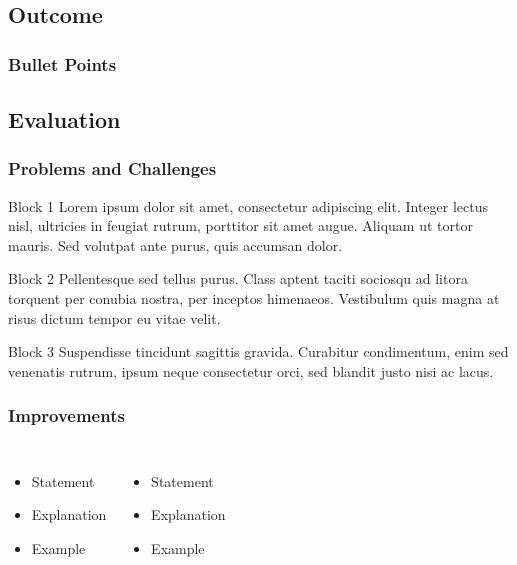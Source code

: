 \documentclass{beamer}
\begin{document}
\subsection{Outcome}
\begin{frame}
\frametitle{Bullet Points}




\end{frame}

\subsection{Evaluation}


\begin{frame}
\frametitle{Problems and Challenges}


\begin{block}{Block 1}
Lorem ipsum dolor sit amet, consectetur adipiscing elit. Integer lectus nisl, ultricies in feugiat rutrum, porttitor sit amet augue. Aliquam ut tortor mauris. Sed volutpat ante purus, quis accumsan dolor.
\end{block}

\begin{block}{Block 2}
Pellentesque sed tellus purus. Class aptent taciti sociosqu ad litora torquent per conubia nostra, per inceptos himenaeos. Vestibulum quis magna at risus dictum tempor eu vitae velit.
\end{block}

\begin{block}{Block 3}
Suspendisse tincidunt sagittis gravida. Curabitur condimentum, enim sed venenatis rutrum, ipsum neque consectetur orci, sed blandit justo nisi ac lacus.
\end{block}



\end{frame}


\begin{frame}
\frametitle{Improvements}
\begin{columns}[t] %

\begin{itemize}
\item Statement
\item Explanation
\item Example
\end{itemize}



\begin{itemize}
\item Statement
\item Explanation
\item Example
\end{itemize}

\end{columns}
\end{frame}
\end{document}
